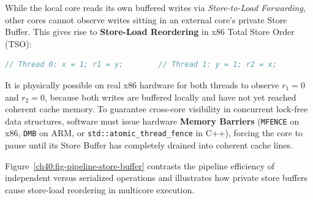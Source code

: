 While the local core reads its own buffered writes via \emph{Store-to-Load Forwarding},
other cores cannot observe writes sitting in an external core's private Store Buffer.
This gives rise to \textbf{Store-Load Reordering} in x86 Total Store Order (TSO):
\begin{lstlisting}[language=C++]
// Thread 0: x = 1; r1 = y;        // Thread 1: y = 1; r2 = x;
\end{lstlisting}
It is physically possible on real x86 hardware for both threads to observe $r_1 = 0$
and $r_2 = 0$, because both writes are buffered locally and have not yet reached coherent
cache memory.
To guarantee cross-core visibility in concurrent lock-free data structures, software must
issue hardware \textbf{Memory Barriers} (\texttt{MFENCE} on x86, \texttt{DMB} on ARM, or
\texttt{std::atomic\_thread\_fence} in C++), forcing the core to pause until its Store
Buffer has completely drained into coherent cache lines.

Figure~\ref{ch40:fig-pipeline-store-buffer} contrasts the pipeline efficiency of independent
versus serialized operations and illustrates how private store buffers cause store-load reordering
in multicore execution.

